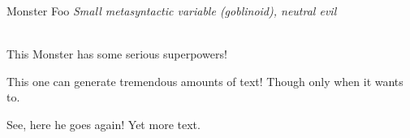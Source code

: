 \documentclass[10pt,twoside,twocolumn,openany]{book}
\begin{document}
\begin{monsterbox}{Monster Foo}
	\textit{Small metasyntactic variable (goblinoid), neutral evil}\\
	\hline
	\basics[%
	armorclass = 12,
	hitpoints  = 16 (3d8 + 3),
	speed      = 50 ft
	]
	\hline
	\stats[
    STR = \stat{12}, %
    DEX = \stat{7}
	]
	\hline
	\details[%
	languages = {Common Lisp, Erlang},
	]
	\hline \\[1mm]
	\begin{monsteraction}
		This Monster has some serious superpowers!
	\end{monsteraction}
	\begin{monsteraction}
		This one can generate tremendous amounts of text! Though only when it wants to.
	\end{monsteraction}

	\begin{monsteraction}
    See, here he goes again! Yet more text.
	\end{monsteraction}
\end{monsterbox}

\end{document}
